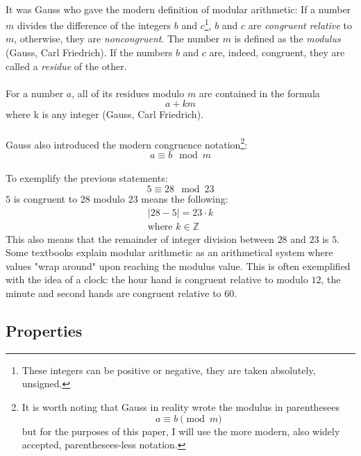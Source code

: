 \documentclass[a4paper, 12pt]{article}
\begin{document}
\paragraph*{}
It was Gauss who gave the modern definition of modular arithmetic: If a number $m$ divides the difference of the 
integers $b$ and $c$\footnote{These integers can be positive or negative, they are taken absolutely, unsigned.}, 
$b$ and $c$ are \textit{congruent relative} to $m$, otherwise, they are \textit{noncongruent}. The number $m$ is 
defined as the \textit{modulus} (Gauss, Carl Friedrich). If the numbers $b$ and $c$ are, indeed, congruent, they are 
called a \textit{residue} of the other.

\paragraph*{}
For a number $a$, all of its residues modulo $m$ are contained in the formula
$$a + km$$
where k is any integer (Gauss, Carl Friedrich).

\paragraph*{}
Gauss also introduced the modern congruence notation\footnote{It is worth noting that Gauss in reality wrote the 
modulus in parenthesees $$a \equiv b \pmod{m}$$ but for the purposes of this paper, I will use the more modern, also 
widely accepted, parenthesees-less notation.}:
$$a \equiv b \mod m$$

\paragraph*{}
To exemplify the previous statements:
$$5 \equiv 28 \mod 23$$
$5$ is congruent to $28$ modulo $23$ means the following:
\begin{gather*}
  \lvert 28 - 5 \rvert = 23 \cdot k\\
  \text{where } k \in \mathbb{Z}
\end{gather*}
This also means that the remainder of integer division between $28$ and $23$ is $5$. Some textbooks explain modular 
arithmetic as an arithmetical system where values "wrap around" upon reaching the modulus value. This is often 
exemplified with the idea of a clock: the hour hand is congruent relative to modulo $12$, the minute and second hands 
are congruent relative to $60$.

\subsection{Properties}
\end{document}
